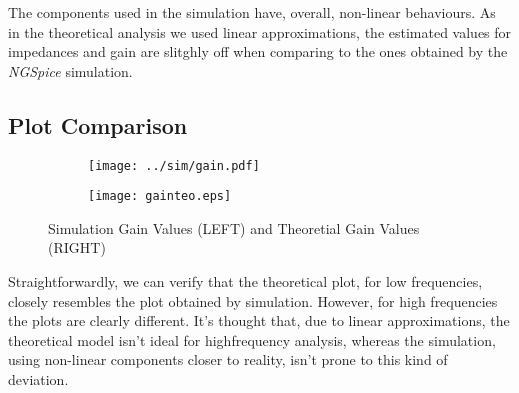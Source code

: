 The components used in the simulation have, overall, non-linear behaviours. As in the theoretical analysis we used linear approximations, the estimated values for impedances and gain are slitghly off when comparing to the ones obtained by the \textit{NGSpice} simulation.



\subsection{Plot Comparison}

\vspace{-3cm}

\begin{figure}[ht]
\centering
\begin{subfigure}{.5\textwidth}
  \centering
  \texttt{[image: ../sim/gain.pdf]}
\end{subfigure}%
\begin{subfigure}{.5\textwidth}
  \centering
  \vspace{3cm}
  \texttt{[image: gainteo.eps]}
\end{subfigure}
\caption{Simulation Gain Values (LEFT) and Theoretial Gain Values (RIGHT)}
\label{fig:sbs3}
\end{figure}


Straightforwardly, we can verify that the theoretical plot, for low frequencies, closely resembles the plot obtained by simulation. However, for high frequencies the plots are clearly different. It's thought that, due to linear approximations, the theoretical model isn't ideal for highfrequency analysis, whereas the simulation, using non-linear components closer to reality, isn't prone to this kind of deviation.